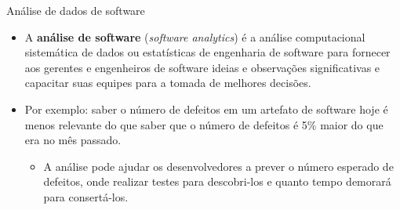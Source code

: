 \documentclass{beamer}
\begin{document}
\begin{frame}{Análise de dados de software}
	\begin{itemize}
		\justifying
		\item<1> A \textbf{análise de software} (\textit{software analytics}) é a análise computacional sistemática de dados ou estatísticas de engenharia de software para fornecer aos gerentes e engenheiros de software ideias e observações significativas e capacitar suas equipes para a tomada de melhores decisões.
		\item<2> Por exemplo: saber o número de defeitos em um artefato de software hoje é menos relevante do que saber que o número de defeitos é 5\% maior do que era no mês passado.
			\begin{itemize}
				\justifying
				\item<2> A análise pode ajudar os desenvolvedores a prever o número esperado de defeitos, onde realizar testes para descobri-los e quanto tempo demorará para consertá-los.
			\end{itemize}
	\end{itemize}
\end{frame}

\end{document}
